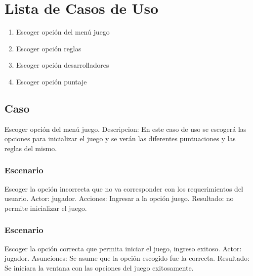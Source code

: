 \documentclass[11pt]{article} %
\begin{document}
\maketitle


\chapter{Lista de Casos de Uso}

\begin{enumerate}
	\item {Escoger opción del menú juego}
	\item {Escoger opción reglas}	
	\item{Escoger opción desarrolladores}
	\item{Escoger opción puntaje}
\end{enumerate}

\section{Caso}Escoger  opción del menú juego.\newline\newline
Descripcion: En este caso de uso se escogerá las opciones para inicializar el juego y se verán  las diferentes  puntuaciones y las reglas del mismo.

	\subsection{Escenario}
	 Escoger la opción incorrecta que no va corresponder con los requerimientos del usuario.\newline \newline
Actor: jugador.\newline
Acciones: Ingresar a la opción juego.\newline
Resultado: no permite inicializar el juego.\newline

\subsection{Escenario}
Escoger la opción correcta que permita iniciar el  juego, ingreso exitoso.\newline\newline
Actor: jugador.\newline
Asunciones:  Se asume  que la opción escogido fue la correcta.\newline
Resultado: Se iniciara la ventana con las opciones del juego exitosamente.
 
\end{document}
